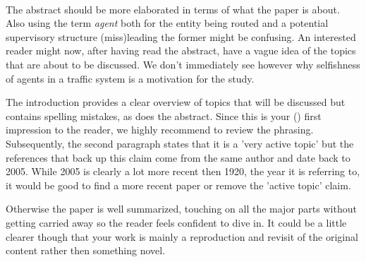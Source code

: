 \documentclass[../review.tex]{subfiles}
\begin{document}
\\
The abstract should be more elaborated in terms of what the paper is about. Also using the term \textit{agent} both for the entity being routed and a potential supervisory structure (miss)leading the former might be confusing. An interested reader might now, after having read the abstract, have a vague idea of the topics that are about to be discussed. We don't immediately see however why selfishness of agents in a traffic system is a motivation for the study.

The introduction provides a clear overview of topics that will be discussed but contains spelling mistakes, as does the abstract. Since this is your () first impression to the reader, we highly recommend to review the phrasing. Subsequently, the second paragraph states that it is a 'very active topic' but the references that back up this claim come from the same author and date back to 2005. While 2005 is clearly a lot more recent then 1920, the year it is referring to, it would be good to find a more recent paper or remove the 'active topic' claim.

Otherwise the paper is well summarized, touching on all the major parts without getting carried away so the reader feels confident to dive in. It could be a little clearer though that your work is mainly a reproduction and revisit of the original content rather then something novel.
\end{document}
